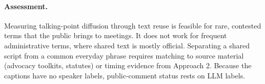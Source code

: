 \paragraph{Assessment.} Measuring talking-point diffusion through text reuse is feasible for rare,
contested terms that the public brings to meetings. It does not work for frequent administrative
terms, where shared text is mostly official. Separating a shared script from a common everyday
phrase requires matching to source material (advocacy toolkits, statutes) or timing evidence from
Approach 2. Because the captions have no speaker labels, public-comment status rests on LLM labels.
